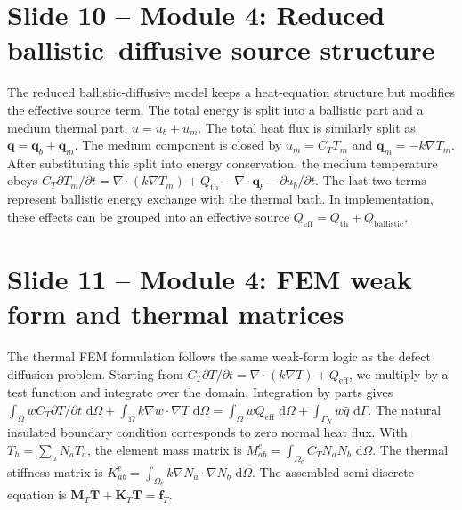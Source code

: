 \documentclass[11pt]{article}
\newcommand{\dd}{\,\mathrm{d}}
\newcommand{\grad}{\nabla}
\newcommand{\divg}{\nabla\!\cdot}
\newcommand{\mat}[1]{\mathbf{#1}}
\newcommand{\vect}[1]{\bm{#1}}
\begin{document}
\section*{Slide 10 -- Module 4: Reduced ballistic--diffusive source structure}
\begin{scriptbox}
The reduced ballistic-diffusive model keeps a heat-equation structure but modifies the effective source term. The total energy is split into a ballistic part and a medium thermal part, \(u=u_b+u_m\). The total heat flux is similarly split as \(\vect{q}=\vect{q}_b+\vect{q}_m\). The medium component is closed by \(u_m=C_TT_m\) and \(\vect{q}_m=-k\grad T_m\). After substituting this split into energy conservation, the medium temperature obeys \(C_T\partial T_m/\partial t=\divg(k\grad T_m)+Q_{\mathrm{th}}-\divg\vect{q}_b-\partial u_b/\partial t\). The last two terms represent ballistic energy exchange with the thermal bath. In implementation, these effects can be grouped into an effective source \(Q_{\mathrm{eff}}=Q_{\mathrm{th}}+Q_{\mathrm{ballistic}}\).
\end{scriptbox}

\section*{Slide 11 -- Module 4: FEM weak form and thermal matrices}
\begin{scriptbox}
The thermal FEM formulation follows the same weak-form logic as the defect diffusion problem. Starting from \(C_T\partial T/\partial t=\divg(k\grad T)+Q_{\mathrm{eff}}\), we multiply by a test function and integrate over the domain. Integration by parts gives \(\int_\Omega wC_T\partial T/\partial t\,\dd\Omega+\int_\Omega k\grad w\cdot\grad T\,\dd\Omega=\int_\Omega wQ_{\mathrm{eff}}\,\dd\Omega+\int_{\Gamma_N}w\bar{q}\,\dd\Gamma\). The natural insulated boundary condition corresponds to zero normal heat flux. With \(T_h=\sum_aN_aT_a\), the element mass matrix is \(M^e_{ab}=\int_{\Omega_e}C_TN_aN_b\,\dd\Omega\). The thermal stiffness matrix is \(K^e_{ab}=\int_{\Omega_e}k\grad N_a\cdot\grad N_b\,\dd\Omega\). The assembled semi-discrete equation is \(\mat{M}_T\dot{\vect{T}}+\mat{K}_T\vect{T}=\vect{f}_T\).
\end{scriptbox}
\end{document}
